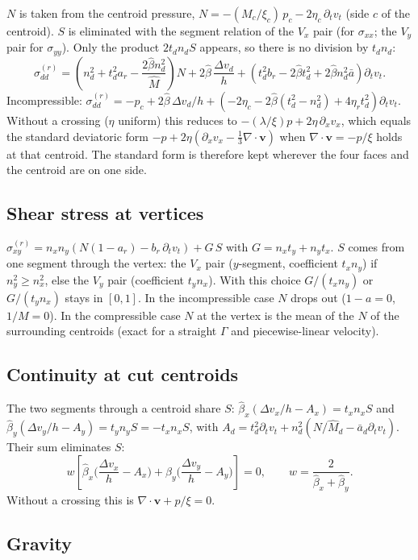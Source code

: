 \documentclass[11pt,a4paper]{article}
\begin{document}
$N$ is taken from the centroid pressure, $N=-(M_c/\xi_c)\,p_c-2\eta_c\,\partial_tv_t$ (side $c$
of the centroid). $S$ is eliminated with the segment relation of the $V_x$ pair (for
$\sigma_{xx}$; the $V_y$ pair for $\sigma_{yy}$). Only the product $2t_dn_dS$ appears, so there
is no division by $t_dn_d$:
\[
\sigma_{dd}^{(r)}=\left(n_d^2+t_d^2a_r-\frac{2\hat\beta n_d^2}{\hat M}\right)N
+2\hat\beta\,\frac{\Delta v_d}{h}
+\left(t_d^2b_r-2\hat\beta t_d^2+2\hat\beta n_d^2\bar a\right)\partial_tv_t .
\]
Incompressible: $\sigma_{dd}^{(r)}=-p_c+2\hat\beta\,\Delta v_d/h+\left(-2\eta_c-2\hat\beta(t_d^2-n_d^2)+4\eta_rt_d^2\right)\partial_tv_t$.
Without a crossing ($\eta$ uniform) this reduces to $-(\lambda/\xi)p+2\eta\,\partial_xv_x$, which
equals the standard deviatoric form $-p+2\eta(\partial_xv_x-\tfrac13\nabla\cdot\mathbf v)$ when
$\nabla\cdot\mathbf v=-p/\xi$ holds at that centroid. The standard form is therefore kept wherever
the four faces and the centroid are on one side.

\subsection*{Shear stress at vertices}

$\sigma_{xy}^{(r)}=n_xn_y\left(N(1-a_r)-b_r\,\partial_tv_t\right)+G\,S$ with
$G=n_xt_y+n_yt_x$. $S$ comes from one segment through the vertex: the $V_x$ pair ($y$-segment,
coefficient $t_xn_y$) if $n_y^2\ge n_x^2$, else the $V_y$ pair (coefficient $t_yn_x$). With this
choice $G/(t_xn_y)$ or $G/(t_yn_x)$ stays in $[0,1]$. In the incompressible case $N$ drops out
($1-a=0$, $1/M=0$). In the compressible case $N$ at the vertex is the mean of the $N$ of the
surrounding centroids (exact for a straight $\Gamma$ and piecewise-linear velocity).

\subsection*{Continuity at cut centroids}

The two segments through a centroid share $S$: $\hat\beta_x(\Delta v_x/h-A_x)=t_xn_xS$ and
$\hat\beta_y(\Delta v_y/h-A_y)=t_yn_yS=-t_xn_xS$, with
$A_d=t_d^2\partial_tv_t+n_d^2(N/\hat M_d-\bar a_d\partial_tv_t)$. Their sum eliminates $S$:
\[
w\left[\hat\beta_x\Big(\frac{\Delta v_x}{h}-A_x\Big)+\hat\beta_y\Big(\frac{\Delta v_y}{h}-A_y\Big)\right]=0,\qquad
w=\frac2{\hat\beta_x+\hat\beta_y}.
\]
Without a crossing this is $\nabla\cdot\mathbf v+p/\xi=0$.

\subsection*{Gravity}
\end{document}
